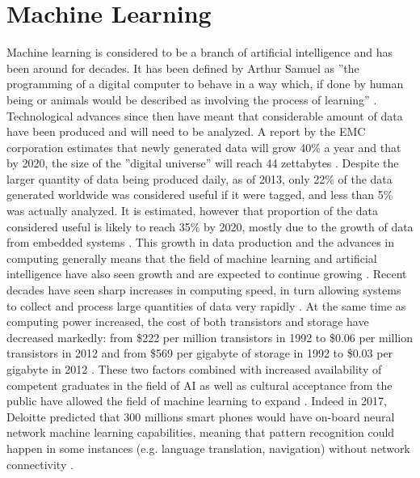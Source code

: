 \section{Machine Learning}
Machine learning is considered to be a branch of artificial intelligence and has been around for decades. It has been defined by Arthur Samuel as ''the programming of a digital computer to behave in a way which, if done by human being or animals would be described as involving the process of learning'' \citep{Samuel:1959vp}.\newline 
Technological advances since then have meant that considerable amount of data have been produced and will need to be analyzed. A report by the EMC corporation estimates that newly generated data will grow 40\% a year and that by 2020, the size of the ''digital universe'' will reach 44 zettabytes \citep{EMC:ylTs53OV}. Despite the larger quantity of data being produced daily, as of 2013, only 22\% of the data generated worldwide was considered useful if it were tagged, and less than 5\% was actually analyzed. It is estimated, however that proportion of the data considered useful is likely to reach 35\% by 2020, mostly due to the growth of data from embedded systems \citep{EMC:ylTs53OV}.\newline
This growth in data production and the advances in computing generally means that the field of machine learning and artificial intelligence have also seen growth and are expected to continue growing \citep{Colombus:wm}. Recent decades have seen sharp increases in computing speed, in turn allowing systems to collect and process large quantities of data very rapidly \citep{Denning:2016fz}.\newline
At the same time as computing power increased, the cost of both transistors and storage have decreased markedly: from \$222 per million transistors in 1992 to \$0.06 per million transistors in 2012 and from \$569 per gigabyte of storage in 1992 to \$0.03 per gigabyte in 2012 \citep{Hagel:2013ur}. These two factors combined with increased availability of competent graduates in the field of AI as well as cultural acceptance from the public have allowed the field of machine learning to expand \citep{Evans:sHGdqFvY}. Indeed in 2017, Deloitte predicted that 300 millions smart phones would have on-board neural network machine learning capabilities, meaning that pattern recognition could happen in some instances (e.g. language translation, navigation) without network connectivity \citep{Deloitte:2017wo}.\newline

